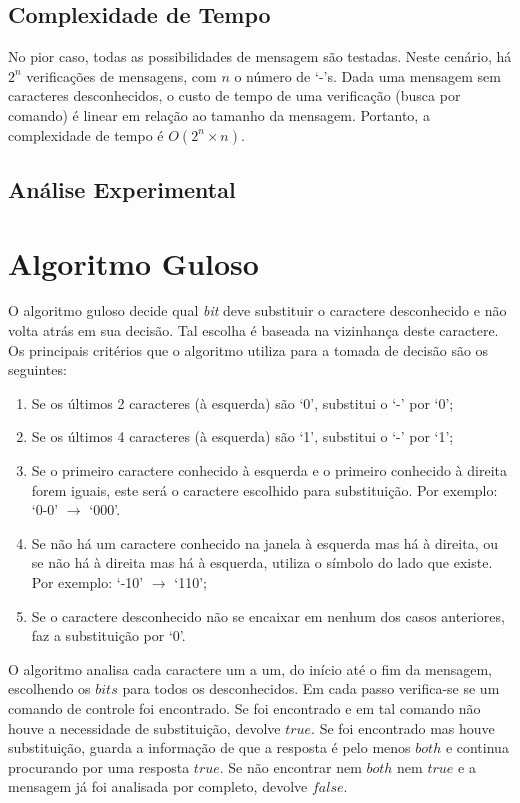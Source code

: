 \documentclass[a4paper,12pt,titlepage]{article}
\begin{document}
\subsection{Complexidade de Tempo}

No pior caso, todas as possibilidades de mensagem são testadas. Neste cenário, há $2^n$ verificações de mensagens, com $n$ o número de `-'s. Dada uma mensagem sem caracteres desconhecidos, o custo de tempo de uma verificação (busca por comando) é linear em relação ao tamanho da mensagem. Portanto, a complexidade de tempo é $O(2^n \times n)$.

\subsection{Análise Experimental}

\section{Algoritmo Guloso}

O algoritmo guloso decide qual \textit{bit} deve substituir o caractere desconhecido e não volta atrás em sua decisão. Tal escolha é baseada na vizinhança deste caractere. Os principais critérios que o algoritmo utiliza para a tomada de decisão são os seguintes:

\begin{enumerate}[leftmargin=1.5cm]
    \item Se os últimos 2 caracteres (à esquerda) são `0', substitui o `-' por `0';
    \item Se os últimos 4 caracteres (à esquerda) são `1', substitui o `-' por `1';  
    \item Se o primeiro caractere conhecido à esquerda e o primeiro conhecido à direita forem iguais, este será o caractere escolhido para substituição. Por exemplo: `0-0' $\rightarrow$ `000'. 
    \item Se não há um caractere conhecido na janela à esquerda mas há à direita, ou se não há à direita mas há à esquerda, utiliza o símbolo do lado que existe. Por exemplo: `-10' $\rightarrow$ `110'; 
    \item Se o caractere desconhecido não se encaixar em nenhum dos casos anteriores, faz a substituição por `0'.
\end{enumerate}

O algoritmo analisa cada caractere um a um, do início até o fim da mensagem, escolhendo os $bits$ para todos os desconhecidos. Em cada passo verifica-se se um comando de controle foi encontrado. Se foi encontrado e em tal comando não houve a necessidade de substituição, devolve $true$. Se foi encontrado mas houve substituição, guarda a informação de que a resposta é pelo menos $both$ e continua procurando por uma resposta $true$. Se não encontrar nem $both$ nem $true$ e a mensagem já foi analisada por completo, devolve $false$.
\end{document}

